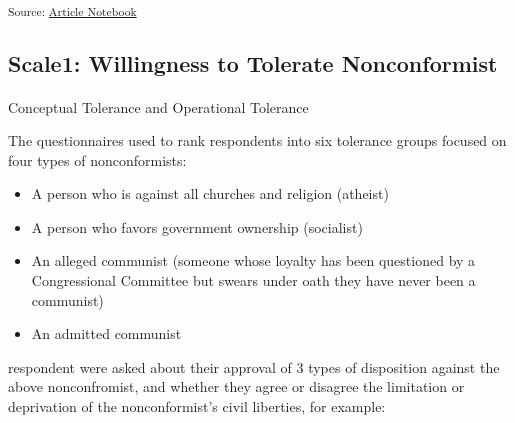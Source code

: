 \documentclass[
  letterpaper,
  DIV=11,
  numbers=noendperiod]{scrartcl}
\makeatletter
\let\oldparagraph\paragraph
\renewcommand{\paragraph}{
    \@ifstar
      \xxxParagraphStar
      \xxxParagraphNoStar
  }
\newcommand{\xxxParagraphStar}[1]{\oldparagraph*{#1}\mbox{}}
\newcommand{\xxxParagraphNoStar}[1]{\oldparagraph{#1}\mbox{}}
\providecommand{\tightlist}{%
  \setlength{\itemsep}{0pt}\setlength{\parskip}{0pt}}\usepackage{longtable,booktabs,array}
\makeatother
\begin{document}
\textsubscript{Source:
\href{https://h-christy.github.io/data-ethics-final/index.qmd.html}{Article
Notebook}}

\subsection{Scale1: Willingness to Tolerate
Nonconformist}\label{scale1-willingness-to-tolerate-nonconformist}

\paragraph{Conceptual Tolerance and Operational
Tolerance}\label{conceptual-tolerance-and-operational-tolerance}

The questionnaires used to rank respondents into six tolerance groups
focused on four types of nonconformists:

\begin{itemize}
\tightlist
\item
  A person who is against all churches and religion (atheist)
\item
  A person who favors government ownership (socialist)
\item
  An alleged communist (someone whose loyalty has been questioned by a
  Congressional Committee but swears under oath they have never been a
  communist)
\item
  An admitted communist
\end{itemize}

respondent were asked about their approval of 3 types of disposition
against the above nonconfromist, and whether they agree or disagree the
limitation or deprivation of the nonconformist's civil liberties, for
example:
\end{document}
